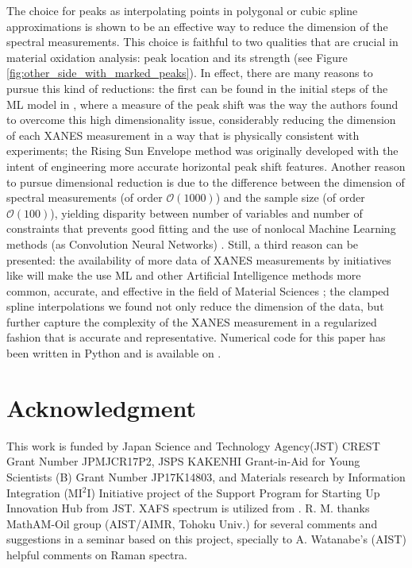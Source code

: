 \documentclass[%
 reprint,
 amsmath,amssymb,
 aps,
]{revtex4-1}
\begin{document}
The choice for peaks as interpolating points in polygonal or cubic spline approximations is shown to be an effective way to reduce the dimension of the spectral measurements. This choice is faithful to  two qualities that are crucial in material oxidation analysis:  peak location and its strength (see Figure \ref{fig:other_side_with_marked_peaks}). In effect, there are many reasons to pursue this kind of reductions: the first can be found in the  initial steps of the ML model in \cite{miyazato2019automatic}, where  a measure of the peak shift was the way the authors  found to  overcome this high dimensionality issue, considerably reducing the dimension of each XANES measurement in a way that is physically consistent with experiments; the Rising Sun Envelope method was originally developed with the intent of engineering more accurate horizontal peak shift features. Another reason to pursue dimensional reduction is due to   the difference between the dimension of spectral measurements (of order $\mathcal{O}(1000)$) and the
sample size (of order $\mathcal{O}(100)$), yielding  disparity  between number of variables and number of constraints  that prevents good fitting and the use of nonlocal Machine Learning methods (as Convolution Neural Networks) \cite[\S 9]{goodfellow2016deep}.
Still, a third reason can be presented: the availability of more data of XANES measurements by initiatives like  \cite{mathew2018high} will make the use ML and other Artificial Intelligence methods more common, accurate, and effective in the field of Material Sciences \cite{butler2018machine,takahashi2016materials}; the clamped spline interpolations we found not only reduce the dimension of the data, but further capture the complexity of the XANES measurement in a regularized fashion that is accurate and representative.\newline
\indent
Numerical code for this paper has been written in Python and is  available on \cite{github}. 


\section*{Acknowledgment}\label{sec:acknowledgment}
This work is funded by Japan Science and Technology Agency(JST) CREST Grant Number JPMJCR17P2, JSPS KAKENHI Grant-in-Aid for Young Scientists (B) Grant Number JP17K14803, and Materials research by Information Integration (MI$^2$I) Initiative project of the Support Program for Starting Up Innovation Hub from JST.
XAFS spectrum  is utilized from \cite{Asakura}.
R. M. thanks  MathAM-Oil group (AIST/AIMR, Tohoku Univ.) for several comments and suggestions in a seminar based on  this project, specially to A. Watanabe's (AIST) helpful comments on Raman spectra.
\end{document}
